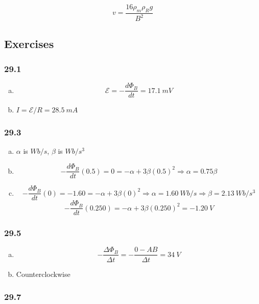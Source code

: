 \documentclass{article}
\begin{document}
\[v = \frac{16 \rho_m \rho_R g}{B^2}\]

\subsection{Exercises}

\subsubsection{29.1}

\begin{enumerate}[(a)]
  \item \[\mathcal{E} = -\frac{d \Phi_B}{dt} = \qty{17.1}{mV}\]

  \item $I = \mathcal{E} / R = \qty{28.5}{mA}$
\end{enumerate}

\subsubsection{29.3}

\begin{enumerate}[(a)]
  \item $\alpha$ is $\unit{Wb/s}$, $\beta$ is $\unit{Wb/s^3}$

  \item \[-\frac{d \Phi_B}{dt}(0.5) = 0 = -\alpha + 3 \beta (0.5)^2 \Rightarrow \alpha = 0.75 \beta\]

  \item \[-\frac{d \Phi_B}{dt}(0) = -1.60 = -\alpha + 3 \beta (0)^2 \Rightarrow \alpha = \qty{1.60}{Wb/s} \Rightarrow \beta = \qty{2.13}{Wb/s^3}\] \[-\frac{d \Phi_B}{dt}(0.250) = -\alpha + 3 \beta (0.250)^2 = \qty{-1.20}{V}\]
\end{enumerate}

\subsubsection{29.5}

\begin{enumerate}[(a)]
  \item \[-\frac{\Delta \Phi_B}{\Delta t} = -\frac{0 - A B}{\Delta t} = \qty{34}{V}\]

  \item Counterclockwise
\end{enumerate}

\subsubsection{29.7}
\end{document}
